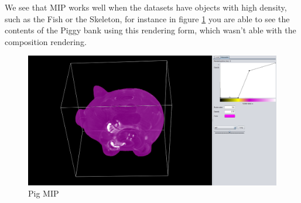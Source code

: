 \documentclass[a4paper,twoside,11pt]{article}
\begin{document}
We see that MIP works well when the datasets have objects with high density, such as the Fish or the Skeleton, for instance in figure \ref{fig:PigMIP} you are able to see the contents of the Piggy bank using this rendering form, which wasn't able with the composition rendering.
\begin{figure}[h]
    \includegraphics[width=\textwidth]{SanderImages/PigMIP2.png}
    \caption{Pig MIP}
    \label{fig:PigMIP}
\end{figure}
\end{document}
